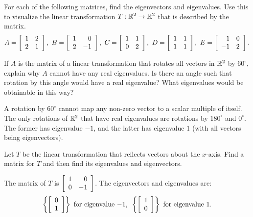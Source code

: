 \documentclass{ximera}
\author{Zack Reed}
\begin{document}
\begin{exercise}
  For each of the following matrices, find the eigenvectors and
  eigenvalues. Use this to visualize the linear transformation
  $T:\R^2\to\R^2$ that is described by the matrix.
  \begin{equation*}
    A = \startmat{rr}
      1 & 2 \\
      2 & 1 \\
    \stopmat,
    \quad
    B = \startmat{rr}
      1 & 0 \\
      2 & -1 \\
    \stopmat,
    \quad
    C = \startmat{rr}
      1 & 1 \\
      0 & 2 \\
    \stopmat,
    \quad
    D = \startmat{rr}
      1 & 1 \\
      1 & 1 \\
    \stopmat,
    \quad
    E = \startmat{rr}
      1 & 0 \\
      -1 & 2 \\
    \stopmat.
  \end{equation*}
\end{exercise}

\begin{exercise}
  If $A$ is the matrix of a linear transformation that rotates all
  vectors in $\R^2$ by $60^{\circ}$, explain why $A$ cannot have any
  real eigenvalues. Is there an angle such that rotation by this
  angle would have a real eigenvalue? What eigenvalues would be
  obtainable in this way?
  \begin{solution}
    A rotation by $60^{\circ}$ cannot map any non-zero vector to a
    scalar multiple of itself. The only rotations of $\R^2$ that have
    real eigenvalues are rotations by $180^{\circ}$ and $0^{\circ}$.
    The former has eigenvalue $-1$, and the latter has eigenvalue $1$
    (with all vectors being eigenvectors).
  \end{solution}
\end{exercise}

\begin{exercise}
  Let $T$ be the linear transformation that reflects vectors about
  the $x$-axis. Find a matrix for $T$ and then find its eigenvalues and
  eigenvectors.
  \begin{solution}
    The matrix of $T$ is $\startmat{rr}
      1 & 0 \\
      0 & -1
    \stopmat$. The eigenvectors and eigenvalues are:
    \begin{equation*}
      \set{\startmat{c}
          0 \\
          1
        \stopmat} ~\mbox{for eigenvalue}~ {-1},
      \quad\set{\startmat{c}
          1 \\
          0
        \stopmat} ~\mbox{for eigenvalue}~ {1}.
    \end{equation*}
  \end{solution}
\end{exercise}
\end{document}
